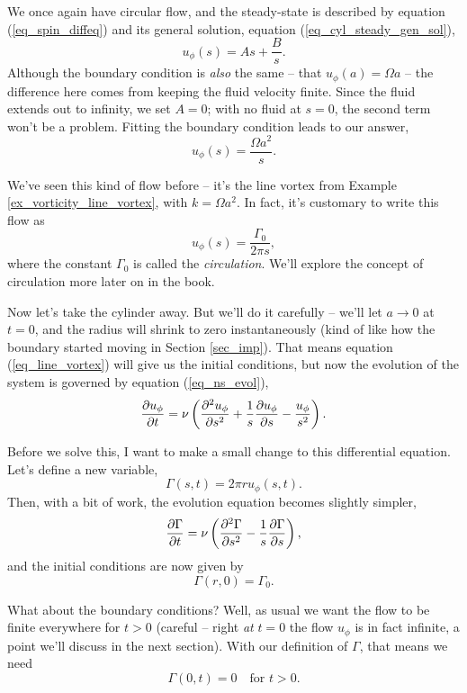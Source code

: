 We once again have circular flow, and the steady-state is described by equation (\ref{eq_spin_diffeq}) and its general solution, equation (\ref{eq_cyl_steady_gen_sol}),
\[
u_\phi (s) = As + \frac{B}{s}.
\]
Although the boundary condition is \emph{also} the same -- that $u_\phi(a) = \Omega a$ -- the difference here comes from keeping the fluid velocity finite.  Since the fluid extends out to infinity, we set $A = 0$; with no fluid at $s=0$, the second term won't be a problem.  Fitting the boundary condition leads to our answer,
\[
u_\phi(s) = \frac{\Omega a^2}{s}.
\]

We've seen this kind of flow before -- it's the line vortex from Example \ref{ex_vorticity_line_vortex}, with $k=\Omega a^2$.  In fact, it's customary to write this flow as
\begin{equation}
\label{eq_line_vortex}
u_\phi(s) = \frac{\Gamma_0}{2\pi s},
\end{equation}
where the constant $\Gamma_0$ is called the \emph{circulation}.  We'll explore the concept of circulation more later on in the book.

Now let's take the cylinder away.  But we'll do it carefully -- we'll let $a \to 0$ at $t=0$, and the radius will shrink to zero instantaneously (kind of like how the boundary started moving in Section \ref{sec_imp}).  That means equation (\ref{eq_line_vortex}) will give us the initial conditions, but now the evolution of the system is governed by equation (\ref{eq_ns_evol}),
\[
\frac{\partial {u_\phi}}{\partial {t}} =  \nu \left( \frac{\partial^2 {u_\phi}}{\partial {s}^2} + \frac{1}{s} \frac{\partial {u_\phi}}{\partial {s}} - \frac{u_\phi}{s^2} \right).
\]

Before we solve this, I want to make a small change to this differential equation.  Let's define a new variable,
\begin{equation}
\Gamma (s, t) = 2\pi r u_\phi(s, t).
\end{equation}
Then, with a bit of work, the evolution equation becomes slightly simpler,
\begin{equation}
\label{eq_evol_gamma}
\frac{\partial {\Gamma}}{\partial {t}} = \nu \left( \frac{\partial^2 {\Gamma}}{\partial {s}^2} - \frac{1}{s} \frac{\partial {\Gamma}}{\partial {s}} \right),
\end{equation}
and the initial conditions are now given by
\begin{equation}
\Gamma(r, 0) = \Gamma_0.
\end{equation}

What about the boundary conditions?  Well, as usual we want the flow to be finite everywhere for $t>0$ (careful -- right \emph{at} $t=0$ the flow $u_\phi$ is in fact infinite, a point we'll discuss in the next section).  With our definition of $\Gamma$, that means we need
\begin{equation}
\Gamma(0, t) = 0 \quad \text{for } t>0.
\end{equation}

